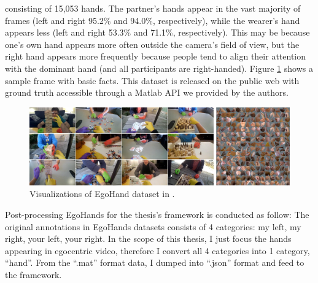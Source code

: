 consisting of 15,053 hands. The partner's hands appear in the vast majority of frames (left and right 95.2\% and 94.0\%, respectively), while the wearer's hand appears less (left and right 53.3\% and 71.1\%, respectively). This may be because one's own hand appears more often outside the camera's field of view, but the right hand appears more frequently because people tend to align their attention with the dominant hand (and all participants are right-handed). Figure \ref{fig:egohands} shows a sample frame with basic facts. This dataset is released on the public web with ground truth accessible through a Matlab API we provided by the authors.
\begin{figure}
	\centerline{\includegraphics[width=1\linewidth]{Figs/egohands.jpg}}
	\caption{Visualizations of EgoHand dataset in \cite{10.1109/ICCV.2015.226}.}
	\label{fig:egohands}
\end{figure}
Post-processing EgoHands for the thesis’s framework is conducted as follow: The original annotations in EgoHands datasets consists of 4 categories: my left, my right, your left, your right. In the scope of this thesis, I just focus the hands appearing in egocentric video, therefore I convert all 4 categories into 1 category, “hand”. From the “.mat” format data, I dumped into “.json” format and feed to the framework.
